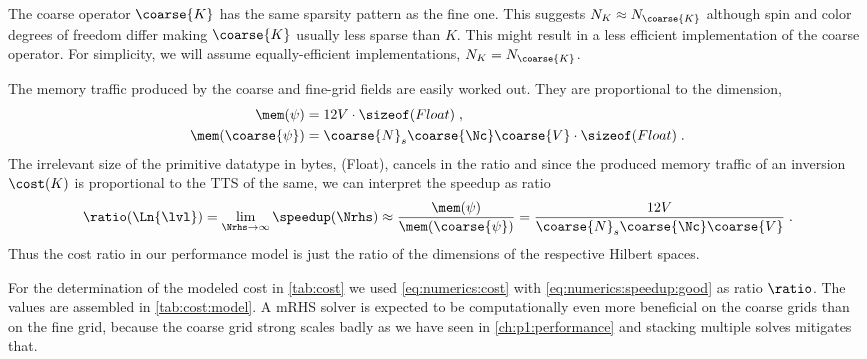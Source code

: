 The coarse operator $\coarse{K}$ has the same sparsity pattern as the fine one.
This suggests $N_{K} \approx N_{\coarse{K}}$ although spin and color degrees of freedom differ making $\coarse{K}$ usually less sparse than $K$.
This might result in a less efficient implementation of the coarse operator.
For simplicity, we will assume equally-efficient implementations, $N_{K} = N_{\coarse{K}}$.

The memory traffic produced by the coarse and fine-grid fields are easily worked out.
They are proportional to the dimension,
\begin{align}
\mem(\psi) &= 12 V \cdot \sizeof(Float) \;, \\
\mem(\coarse{\psi}) &= \coarse{N}_s \coarse{\Nc} \coarse{V} \cdot \sizeof(Float) \;.
\end{align}
The irrelevant size of the primitive datatype in bytes, \sizeof(Float), cancels in the ratio and since the produced memory traffic of an inversion $\cost(K)$ is proportional to the TTS of the same, we can interpret the speedup as ratio
\begin{equation} \label{eq:numerics:speedup:good}
\ratio(\Ln{\lvl})
= \lim_{\Nrhs \to \infty} \speedup(\Nrhs)
\approx \frac{ \mem(\psi) }{ \mem(\coarse{\psi}) }
= \frac{12 V}{ \coarse{N}_s \coarse{\Nc} \coarse{V} } \;.
\end{equation}
Thus the cost ratio in our performance model is just the ratio of the dimensions of the respective Hilbert spaces.

For the determination of the modeled cost in \cref{tab:cost} we used \cref{eq:numerics:cost} with \cref{eq:numerics:speedup:good} as ratio $\ratio$.
The values are assembled in \cref{tab:cost:model}.
A mRHS solver is expected to be computationally even more beneficial on the coarse grids than on the fine grid, because the coarse grid strong scales badly as we have seen in \cref{ch:p1:performance} and stacking multiple solves mitigates that.

